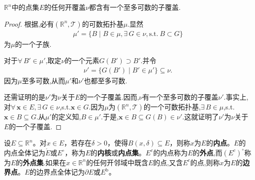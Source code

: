 \documentclass[../../main.tex]{subfiles}%
\begin{document}
\begin{theorem}[Lindelöf定理]\label{theorem:Lindelöf定理}
$\mathbb{R}^n$中的点集$E$的任何开覆盖$\nu$都含有一个至多可数的子覆盖.
\end{theorem}
\begin{proof}

根据,必有$(\mathbb{R}^n,\mathcal{T})$的可数拓扑基$\mu$.显然
\begin{align*}
\mu'=\{B\mid B\in\mu,\exists\,G\in\nu,\text{s.t.}\ B\subset G\}
\end{align*}
为$\mu$的一个子族.

对于$\forall\,B'\in\mu'$,取定$\nu$的一个元素$G(B')\supset B'$.并令
\begin{align*}
\nu'=\{G(B')\mid B'\in\mu'\}\subseteq\nu.
\end{align*}
因为$\mu$至多可数,从而$\mu'$和$\nu'$也都至多可数.

还需证明的是$\nu'$为$\nu$关于$E$的一个子覆盖.因而,$\nu$有一个至多可数的子覆盖$\nu'$.事实上,对$\forall\,\boldsymbol{x}\in E,\exists\,G\in\nu$,s.t.$\boldsymbol{x}\in G$.因为$\mu$为$(\mathbb{R}^n,\mathcal{T})$的一个可数拓扑基,$\exists\,B\in\mu$,s.t.$\boldsymbol{x}\in B\subseteq G$.从$\mu'$的定义知,$B\in\mu'$.于是,$\boldsymbol{x}\in B\subseteq G(B)\in\nu'$.这就证明了$\nu'$为$\nu$关于$E$的一个子覆盖.
\end{proof}

\begin{definition}[内点与边界点]\label{definition:内点与边界点}
设\(E\subseteq\mathbb{R}^n\)。对\(x\in E\)，若存在\(\delta>0\)，使得\(B(x,\delta)\subseteq E\)，则称\(x\)为\(E\)的\textbf{内点}。\(E\)的内点全体记为\(\mathring{E}\)或$E^{\circ}$，称为\(E\)的\textbf{内核}或\textbf{内点集}。$E^c$的内点称为$E$的\textbf{外点},而$(E^c)^{\circ}$称为$E$的\textbf{外点集}.如果在$x\in \mathbb{R}^n$的任何开邻域中既含$E$的点,又含$E^c$的点,则称\(x\)为\(E\)的\textbf{边界点}。$E$的边界点全体记为\(\partial E\)或$E^{\mathrm{b}}$。
\end{definition}
\end{document}
